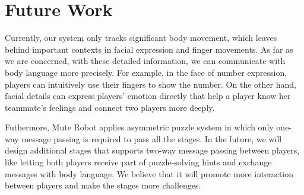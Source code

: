 \documentclass{chi-ext}
\begin{document}





\section{Future Work}

Currently, our system only tracks significant body movement, which leaves behind important contexts in facial expression and finger movements. As far as we are concerned, with these detailed information, we can communicate with body language more precisely. For example, in the face of number expression, players can intuitively use their fingers to show the number. On the other hand, facial details can express players' emotion directly that help a player know her teammate's feelings and connect two players more deeply.


Futhermore, Mute Robot applies asymmetric puzzle system in which
only one-way message passing is required to pass all the stages.
In the future, we will design additional stages that supports two-way message passing between players, like letting both players receive part of puzzle-solving hints and exchange messages with body language.
We believe that it will promote more interaction between players and make the stages more challenges.
\end{document}
